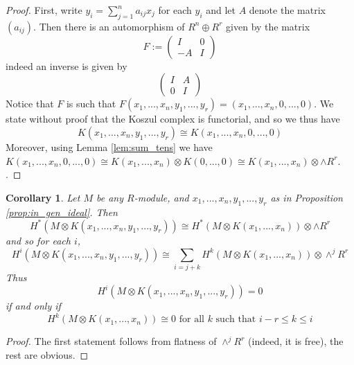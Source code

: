 \documentclass[12pt]{article}
\theoremstyle{plain}
\newtheorem{cor}[thm]{Corollary}
\theoremstyle{definition}
\begin{document}
\begin{proof}
	First, write $y_i = \sum_{j = 1}^n a_{ij}x_j$ for each $y_i$ and let $A$ denote the matrix $(a_{ij})$. Then there is an automorphism of $R^n \oplus R^r$ given by the matrix
	\begin{equation}
		F:= \begin{pmatrix}
			I & 0\\
			-A & I
		\end{pmatrix}
	\end{equation}
	indeed an inverse is given by
	\begin{equation}
		\begin{pmatrix}
			I & A\\
			0 & I
		\end{pmatrix}
	\end{equation}
	Notice that $F$ is such that $F(x_1,...,x_n,y_1,...,y_r) = (x_1,...,x_n,0,...,0)$.  We state without proof that the Koszul complex is functorial, and so we thus have
	\begin{equation}
		K(x_1,...,x_n,y_1,...,y_r) \cong K(x_1,...,x_n,0,...,0)
	\end{equation}
	Moreover, using Lemma \ref{lem:sum_tens} we have $K(x_1,...,x_n,0,...,0) \cong K(x_1,...,x_n) \otimes K(0,...,0) \cong K(x_1,...,x_n) \otimes \wedge R^r$. .
\end{proof}
\begin{cor}
	Let $M$ be any $R$-module, and $x_1,...,x_n,y_1,...,y_r$ as in Proposition \ref{prop:in_gen_ideal}. Then
	\begin{equation}
		H^\ast (M \otimes K(x_1,...,x_n,y_1,...,y_r))\cong H^\ast(M \otimes K(x_1,...,x_n)) \otimes \wedge R^r
	\end{equation}
	and so for each $i$,
	\begin{equation}
		H^i(M \otimes K(x_1,...,x_n,y_1,...,y_r)) \cong \sum_{i = j + k}H^k(M \otimes K(x_1,...,x_n)) \otimes \wedge^j R^r
	\end{equation}
	Thus
	\begin{equation}
		H^i(M \otimes K(x_1,...,x_n,y_1,...,y_r)) = 0
	\end{equation}
	if and only if
	\begin{equation}
		H^k(M \otimes K(x_1,...,x_n)) \cong 0\text{ for all }k\text{ such that }i-r \leq k \leq i
	\end{equation}
\end{cor}
\begin{proof}
	The first statement follows from flatness of $\wedge^j R^r$ (indeed, it is free), the rest are obvious.
\end{proof}
\end{document}
